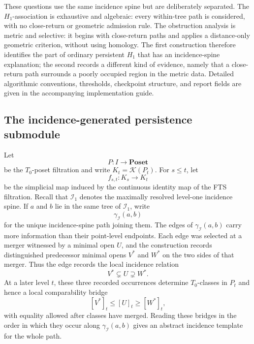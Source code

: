 \documentclass[a4paper,11pt]{article}
\theoremstyle{definition}
\theoremstyle{remark}
\begin{document}
These questions use the same incidence spine but are deliberately separated. The $H_1$-association is exhaustive and algebraic: every within-tree path is considered, with no close-return or geometric admission rule.  The obstruction analysis is metric and selective: it begins with close-return paths and applies a distance-only geometric criterion, without using homology. The first construction therefore identifies the part of ordinary persistent $H_1$ that has an incidence-spine explanation; the second records a different kind of evidence, namely that a close-return path surrounds a poorly occupied region in the metric data. Detailed algorithmic conventions, thresholds, checkpoint structure, and report fields are given in the accompanying implementation guide.

\subsection{The incidence-generated persistence submodule}
\label{subsec:incidence-generated-submodule}

Let
$$
P\colon I\longrightarrow \mathbf{Poset}
$$
be the $T_0$-poset filtration and write $K_t=\mathcal K(P_t)$. For $s\leq t$, let
$$
f_{s,t}\colon K_s\longrightarrow K_t
$$
be the simplicial map induced by the continuous identity map of the FTS filtration. Recall that $\mathcal I_1$ denotes the maximally resolved level-one incidence spine. If $a$ and $b$ lie in the same tree of $\mathcal I_1$, write
$$
\gamma_{\mathcal I}(a,b)
$$
for the unique incidence-spine path joining them. The edges of $\gamma_{\mathcal I}(a,b)$ carry more information than their point-level endpoints. Each edge was selected at a merger witnessed by a minimal open $U$, and the construction records distinguished predecessor minimal opens $V^*$ and $W^*$ on the two sides of that merger. Thus the edge records the local incidence relation
$$
V^*\subsetneq U\supsetneq W^*.
$$
At a later level $t$, these three recorded occurrences determine $T_0$-classes in $P_t$ and hence a local comparability bridge
$$
[V^*]_t\leq [U]_t\geq [W^*]_t,
$$
with equality allowed after classes have merged. Reading these bridges in the order in which they occur along $\gamma_{\mathcal I}(a,b)$ gives an abstract incidence template for the whole path.
\end{document}

